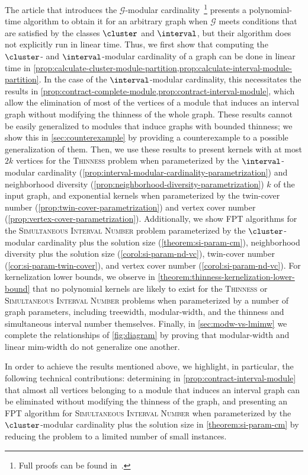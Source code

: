 \documentclass[11pt]{article}
\theoremstyle{plain}
\theoremstyle{definition}
\theoremstyle{remark}
\newcommand{\G}{\mathcal{G}}
\newcommand{\FPT}{{\smaller[0.83]\textsf{\textup{FPT}}}\xspace}
\begin{document}
The article that introduces the $\G$-modular cardinality~\citep{modular-partitions-MFCS23}\footnote{Full proofs can be found in~\citep{modular-partitions-arxiv}.} presents a polynomial-time algorithm to obtain it for an arbitrary graph when $\G$ meets conditions that are satisfied by the classes $\cluster$ and $\interval$, but their algorithm does not explicitly run in linear time. Thus, we first show that computing the $\cluster$- and $\interval$-modular cardinality of a graph can be done in linear time in \cref{prop:calculate-cluster-module-partition,prop:calculate-interval-module-partition}. 
 In the case of the $\interval$-modular cardinality, this necessitates the results in \cref{prop:contract-complete-module,prop:contract-interval-module}, which allow the elimination of most of the vertices of a module that induces an interval graph without modifying the thinness of the whole graph. These results cannot be easily generalized to modules that induce graphs with bounded thinness; we show this in \cref{sec:counterexample} by providing a counterexample to a possible generalization of them. Then, we use these results to present kernels with at most $2k$ vertices for the \textsc{Thinness} problem when parameterized by the $\interval$-modular cardinality (\cref{prop:interval-modular-cardinality-parametrization}) and neighborhood diversity (\cref{prop:neighborhood-diversity-parametrization}) $k$ of the input graph, and exponential kernels when parameterized by the twin-cover number (\cref{prop:twin-cover-parametrization}) and vertex cover number (\cref{prop:vertex-cover-parametrization}). Additionally, we show \FPT algorithms for the \textsc{Simultaneous Interval Number} problem parameterized by the $\cluster$-modular cardinality plus the solution size (\cref{theorem:si-param-cm}), neighborhood diversity plus the solution size (\cref{corol:si-param-nd-vc}), twin-cover number (\cref{cor:si-param-twin-cover}), and vertex cover number (\cref{corol:si-param-nd-vc}). For kernelization lower bounds, we observe in \cref{theorem:thinness-kernelization-lower-bound} that no polynomial kernels are likely to exist for the \textsc{Thinness} or \textsc{Simultaneous Interval Number} problems when parameterized by a number of graph parameters, including treewidth, modular-width, and the thinness and simultaneous interval number themselves. Finally, in \cref{sec:modw-vs-lmimw} we complete the relationships of \cref{fig:diagram} by proving that modular-width and linear mim-width do not generalize one another.

In order to achieve the results mentioned above, we highlight, in particular, the following technical contributions: determining in \cref{prop:contract-interval-module} that almost all vertices belonging to a module that induces an interval graph can be eliminated without modifying the thinness of the graph, and presenting an \FPT algorithm for \textsc{Simultaneous Interval Number} when parameterized by the $\cluster$-modular cardinality plus the solution size in \cref{theorem:si-param-cm} by reducing the problem to a limited number of small instances.
\end{document}
